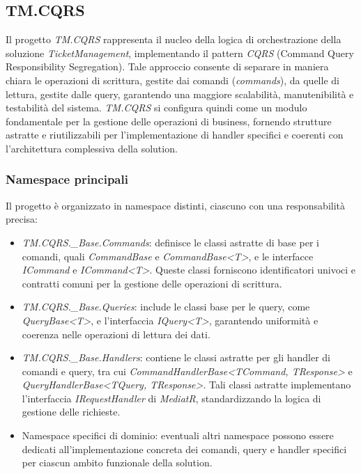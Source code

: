 \subsection{TM.CQRS}

Il progetto \textit{TM.CQRS} rappresenta il nucleo della logica di orchestrazione della soluzione \textit{TicketManagement}, implementando il pattern \textit{CQRS} (Command Query Responsibility Segregation). Tale approccio consente di separare in maniera chiara le operazioni di scrittura, gestite dai comandi (\textit{commands}), da quelle di lettura, gestite dalle query, garantendo una maggiore scalabilità, manutenibilità e testabilità del sistema. \textit{TM.CQRS} si configura quindi come un modulo fondamentale per la gestione delle operazioni di business, fornendo strutture astratte e riutilizzabili per l'implementazione di handler specifici e coerenti con l'architettura complessiva della solution.

\subsubsection{Namespace principali}

Il progetto è organizzato in namespace distinti, ciascuno con una responsabilità precisa:
\begin{itemize}
\item \textit{TM.CQRS.\_Base.Commands}: definisce le classi astratte di base per i comandi, quali \textit{CommandBase} e \textit{CommandBase<T>}, e le interfacce \textit{ICommand} e \textit{ICommand<T>}. Queste classi forniscono identificatori univoci e contratti comuni per la gestione delle operazioni di scrittura.
\item \textit{TM.CQRS.\_Base.Queries}: include le classi base per le query, come \textit{QueryBase<T>}, e l'interfaccia \textit{IQuery<T>}, garantendo uniformità e coerenza nelle operazioni di lettura dei dati.
\item \textit{TM.CQRS.\_Base.Handlers}: contiene le classi astratte per gli handler di comandi e query, tra cui \textit{CommandHandlerBase<TCommand, TResponse>} e \textit{QueryHandlerBase<TQuery, TResponse>}. Tali classi astratte implementano l'interfaccia \textit{IRequestHandler} di \textit{MediatR}, standardizzando la logica di gestione delle richieste.
\item Namespace specifici di dominio: eventuali altri namespace possono essere dedicati all'implementazione concreta dei comandi, query e handler specifici per ciascun ambito funzionale della solution.
\end{itemize}


